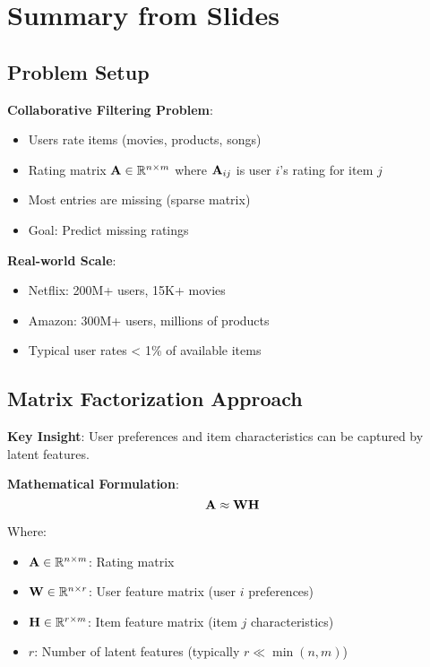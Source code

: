 \documentclass{article}
\begin{document}
\maketitle

\section{Summary from Slides}

\subsection{Problem Setup}

\textbf{Collaborative Filtering Problem}:
\begin{itemize}
    \item Users rate items (movies, products, songs)
    \item Rating matrix $\mathbf{A} \in \mathbb{R}^{n \times m}$ where $\mathbf{A}_{ij}$ is user $i$'s rating for item $j$
    \item Most entries are missing (sparse matrix)
    \item Goal: Predict missing ratings
\end{itemize}

\textbf{Real-world Scale}:
\begin{itemize}
    \item Netflix: 200M+ users, 15K+ movies
    \item Amazon: 300M+ users, millions of products
    \item Typical user rates < 1\% of available items
\end{itemize}

\subsection{Matrix Factorization Approach}

\textbf{Key Insight}: User preferences and item characteristics can be captured by latent features.

\textbf{Mathematical Formulation}:
$$\mathbf{A} \approx \mathbf{W} \mathbf{H}$$

Where:
\begin{itemize}
    \item $\mathbf{A} \in \mathbb{R}^{n \times m}$: Rating matrix
    \item $\mathbf{W} \in \mathbb{R}^{n \times r}$: User feature matrix (user $i$ preferences)
    \item $\mathbf{H} \in \mathbb{R}^{r \times m}$: Item feature matrix (item $j$ characteristics)
    \item $r$: Number of latent features (typically $r \ll \min(n,m)$)
\end{itemize}
\end{document}
